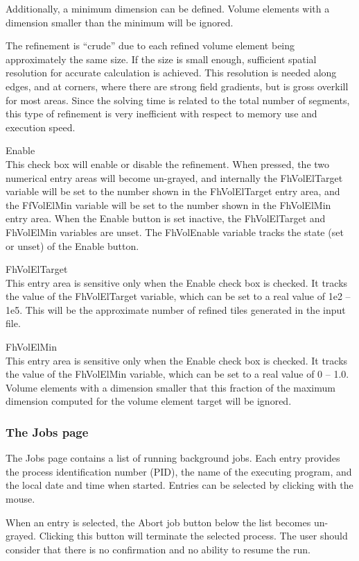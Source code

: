 Additionally, a minimum dimension can be defined.  Volume
elements with a dimension smaller than the minimum will be
ignored.

The refinement is ``crude'' due to each refined volume element
being approximately the same size.  If the size is small
enough, sufficient spatial resolution for accurate calculation
is achieved.  This resolution is needed along edges, and at
corners, where there are strong field gradients, but is gross
overkill for most areas.  Since the solving time is related to
the total number of segments, this type of refinement is very
inefficient with respect to memory use and execution speed.

\begin{description}
\item{\cb Enable}\\
This check box will enable or disable the refinement.  When
pressed, the two numerical entry areas will become un-grayed,
and internally the {\et FhVolElTarget} variable will be set to
the number shown in the {\cb FhVolElTarget} entry area, and
the {\et FfVolElMin} variable will be set to the number shown
in the {\cb FhVolElMin} entry area.  When the {\cb Enable}
button is set inactive, the {\et FhVolElTarget} and {\cb
FhVolElMin} variables are unset.  The {\et FhVolEnable}
variable tracks the state (set or unset) of the {\cb Enable}
button.

\item{\cb FhVolElTarget}\\
This entry area is sensitive only when the {\cb Enable} check
box is checked.  It tracks the value of the {\et
FhVolElTarget} variable, which can be set to a real value of
1e2 -- 1e5.  This will be the approximate number of refined
tiles generated in the input file.

\item{\cb FhVolElMin}\\
This entry area is sensitive only when the {\cb Enable} check
box is checked.  It tracks the value of the {\et FhVolElMin}
variable, which can be set to a real value of 0 -- 1.0. 
Volume elements with a dimension smaller that this fraction of
the maximum dimension computed for the volume element target
will be ignored.
\end{description}

\subsubsection{The Jobs page}

The {\cb Jobs} page contains a list of running background jobs.  Each
entry provides the process identification number (PID), the name of
the executing program, and the local date and time when started. 
Entries can be selected by clicking with the mouse.

When an entry is selected, the {\cb Abort job} button below the list
becomes un-grayed.  Clicking this button will terminate the selected
process.  The user should consider that there is no confirmation and
no ability to resume the run.

